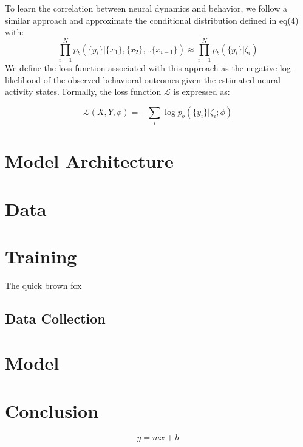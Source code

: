  To learn the correlation between neural dynamics and behavior, we follow a similar approach and approximate the conditional distribution defined in eq(4) with:
\\
 \begin{equation}
   \prod_{i=1}^{N} p_b(\{y_{i}\}| \{x_1\},\{x_2\},..\{x_{i-1}\}) 
   \approx  \prod_{i=1}^{N} p_b(\{y_{i}\}|\zeta_i)
\end{equation}
We define the loss function associated with this approach as the negative log-likelihood of the observed behavioral outcomes given the estimated neural activity states. Formally, the loss function \( \mathcal{L} \) is expressed as:

\[
\mathcal{L}(X,Y,\phi) = -\sum_{i} \log p_b(\{y_i\}|\zeta_i;\phi)
\]



\section{Model Architecture}
\section{Data}
\section{Training}

\lipsum[12]
\begin{table}
  \centering
  \caption{The quick brown fox}
  
\end{table}
\lipsum[13]
\subsection{Data Collection}
\lipsum[16]
\section{Model}
\section{Conclusion}
\lipsum[20]
\begin{equation}
  y = mx + b
\end{equation}
\lipsum[22-25]